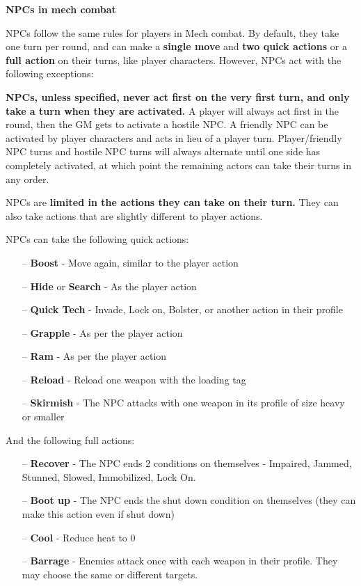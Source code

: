 \begin{center}
    \textbf{NPCs in mech combat}
\end{center}

NPCs follow the same rules for players in Mech combat. By default, they take one turn per
round, and can make a \textbf{single move} and \textbf{two quick actions} or a \textbf{full action} on their turns, like
player characters. However, NPCs act with the following exceptions:

\textbf{NPCs, unless specified, never act first on the very first turn, and only take a turn when they
are activated.} A player will always act first in the round, then the GM gets to activate a hostile
NPC. A friendly NPC can be activated by player characters and acts in lieu of a player turn.
Player/friendly NPC turns and hostile NPC turns will always alternate until one side has
completely activated, at which point the remaining actors can take their turns in any order.

NPCs are \textbf{limited in the actions they can take on their turn.} They can also take actions that
are slightly different to player actions.

NPCs can take the following quick actions:

\begin{itemize}
    \item[--] \textbf{Boost} - Move again, similar to the player action
    \item[--] \textbf{Hide} or \textbf{Search} - As the player action
    \item[--] \textbf{Quick Tech} - Invade, Lock on, Bolster, or another action in their profile
    \item[--] \textbf{Grapple} - As per the player action
    \item[--] \textbf{Ram} - As per the player action
    \item[--] \textbf{Reload} - Reload one weapon with the loading tag
    \item[--] \textbf{Skirmish} - The NPC attacks with one weapon in its profile of size heavy or smaller
\end{itemize}

And the following full actions:
\begin{itemize}
    \item[--] \textbf{Recover} - The NPC ends 2 conditions on themselves - Impaired, Jammed, Stunned, Slowed, Immobilized, Lock On.
    \item[--] \textbf{Boot up} - The NPC ends the shut down condition on themselves (they can make this action even if shut down)
    \item[--] \textbf{Cool} - Reduce heat to 0
    \item[--] \textbf{Barrage} - Enemies attack once with each weapon in their profile. They may choose the same or different targets.
\end{itemize}

